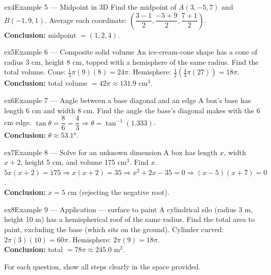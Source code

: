 \documentclass[11pt]{article}
\begin{document}
\begin{example}{ex4}{Example 5 --- Midpoint in 3D}
Find the midpoint of $A(3,-5,7)$ and $B(-1,9,1)$.\soln
Average each coordinate: $\left(\dfrac{3-1}2,\dfrac{-5+9}2,\dfrac{7+1}2\right)$.\\[3pt]\textbf{Conclusion:} midpoint $=(1,2,4)$.
\end{example}

\begin{example}{ex5}{Example 6 --- Composite solid volume}
An ice-cream-cone shape has a cone of radius 3 cm, height 8 cm, topped with a hemisphere of the same radius. Find the total volume.\soln
Cone: $\tfrac13\pi(9)(8)=24\pi$. Hemisphere: $\tfrac12\left(\tfrac43\pi(27)\right)=18\pi$.\\[3pt]\textbf{Conclusion:} total volume $=42\pi\approx131.9\text{ cm}^3$.
\end{example}

\begin{example}{ex6}{Example 7 --- Angle between a base diagonal and an edge}
A box's base has length 6 cm and width 8 cm. Find the angle the base's diagonal makes with the 6 cm edge.\soln
$\tan\theta=\dfrac{8}{6}=\dfrac43\Rightarrow\theta=\tan^{-1}(1.333)$.\\[3pt]\textbf{Conclusion:} $\theta\approx53.1°$.
\end{example}

\begin{example}{ex7}{Example 8 --- Solve for an unknown dimension}
A box has length $x$, width $x+2$, height 5 cm, and volume 175 cm$^3$. Find $x$.\soln
$5x(x+2)=175\Rightarrow x(x+2)=35\Rightarrow x^2+2x-35=0\Rightarrow(x-5)(x+7)=0$.\\[3pt]\textbf{Conclusion:} $x=5$ cm (rejecting the negative root).
\end{example}

\begin{example}{ex8}{Example 9 --- Application --- surface to paint}
A cylindrical silo (radius 3 m, height 10 m) has a hemispherical roof of the same radius. Find the total area to paint, excluding the base (which sits on the ground).\soln
Cylinder curved: $2\pi(3)(10)=60\pi$. Hemisphere: $2\pi(9)=18\pi$.\\[3pt]\textbf{Conclusion:} total $=78\pi\approx245.0\text{ m}^2$.
\end{example}

\clearpage
{}
For each question, show all steps clearly in the space provided.
\end{document}
